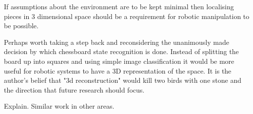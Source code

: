 If assumptions about the environment are to be kept minimal
then localising pieces in 3 dimensional space should be a requirement for robotic manipulation to be possible.

Perhaps worth taking a step back and reconsidering the unanimously made decision by which chessboard state recognition is done.  Instead of splitting 
the board up into squares and using simple image classification it would be more useful for robotic systems to have a 3D representation of the space.
It is the author's belief that "3d reconstruction" would kill two birds with one stone and the direction that future research should focus. 

Explain.  Similar work in other areas.